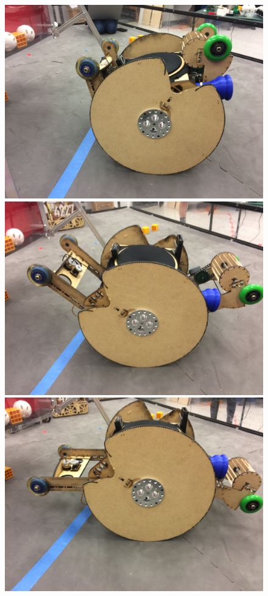 \begin{figure}[h!]
\centering
\begin{minipage}{.32\textwidth}
  \centering
  \includegraphics[width= .9\linewidth]{Design_Overview/Zero.JPG} %
\end{minipage}%
\hfill
\begin{minipage}{.32\textwidth}
  \centering
  \includegraphics[width= .9\linewidth]{Design_Overview/45.JPG} %
\end{minipage}%
  \hfill
\begin{minipage}{.32\textwidth}
  \centering
  \includegraphics[width= .9\linewidth]{Design_Overview/90.JPG} %
\end{minipage}
\end{figure}

